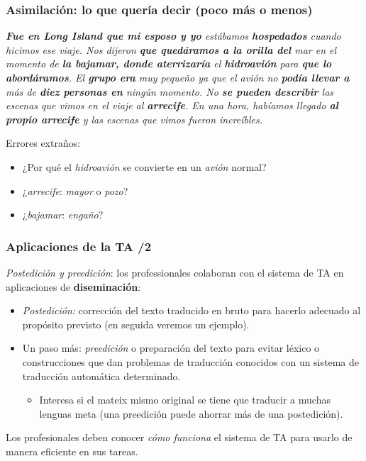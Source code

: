 \documentclass{beamer}
\newcommand{\empha}[1]{\emph{#1}\/}
\begin{document}
\begin{frame}
  \frametitle{Asimilación: lo que quería decir (poco más o menos)}

\empha{\textbf{Fue en Long Island que mi esposo y yo} estábamos \textbf{hospedados} cuando hicimos ese viaje. Nos dijeron \textbf{que quedáramos a la orilla del} mar en el momento de \textbf{la bajamar, donde aterrizaría}  el \textbf{hidroavión} para \textbf{que lo abordáramos}. El \textbf{grupo era} muy pequeño ya que el avión no \textbf{podía llevar a} más de \textbf{diez personas en} ningún momento. No \textbf{se pueden describir} las escenas que vimos en el viaje al \textbf{arrecife}. En una hora, habíamos llegado \textbf{al propio arrecife} y las escenas que vimos fueron increíbles.}

Errores extraños:
\begin{itemize}
\item ¿Por qué el \empha{hidroavión} se convierte en un \empha{avión} normal?
\item ¿\empha{arrecife}:  \empha{mayor} o \empha{pozo}?
\item ¿\empha{bajamar}: \empha{engaño}?
\end{itemize}

\end{frame}



\begin{frame}
\frametitle{Aplicaciones de la TA /2}

\empha{Postedición y preedición}: los professionales colaboran con el
  sistema de TA en aplicaciones de \textbf{diseminación}:
\begin{itemize}
\item\empha{Postedición:} corrección del texto traducido en bruto para hacerlo adecuado al propósito previsto (en seguida veremos un ejemplo).
\item Un paso más: \empha{preedición} o preparación del texto para evitar
  léxico o construcciones que dan problemas de traducción conocidos con un
  sistema de traducción automática determinado. 
  \begin{itemize}
  \item Interesa si el mateix mismo original se tiene que traducir a muchas lenguas meta (una preedición puede ahorrar más de una postedición).

  \end{itemize}
\end{itemize}

  Los profesionales deben conocer \empha{cómo funciona} el sistema de TA para usarlo de manera eficiente en sus tareas.

\end{frame}
\end{document}
